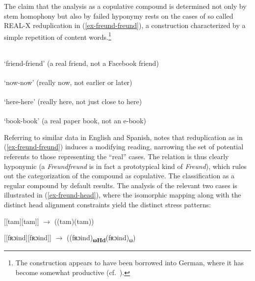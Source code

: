 \documentclass[output=paper
 ,nobabel
 ,draftmode
 ,colorlinks, citecolor=brown
]{langscibook}
\begin{document}
\zl

\noindent
The claim that the analysis as a copulative compound is determined not only by stem homophony but also by failed hyponymy rests on the  cases of so called REAL-X reduplication in (\ref{ex-freund-freund}), a construction characterized by a simple repetition of content words.\footnote{The construction appears to have been borrowed into German, where it has become somewhat productive (cf.\ \citealp{Freywald2015}).}



\eal\label{ex-freund-freund}

\ex {} \\
`friend-friend' (a real friend, not a Facebook friend) \\

\ex {} \\
`now-now' (really now, not earlier or later) \\

\ex {} \\
`here-here' (really here, not just close to here) \\

\ex {} \\
`book-book' (a real paper book, not an e-book) \\


\zl

\largerpage
\noindent
Referring to similar data in English and Spanish, \citet[48]{Horn1993} notes that reduplication as in (\ref{ex-freund-freund}) induces a modifying reading, narrowing the set of potential referents to those representing the ``real'' cases. The relation is thus clearly hyponymic (\eg a \emph{Freundfreund} is in fact a prototypical kind of \emph{Freund}), which rules out the categorization of the compound as copulative. The classification as a regular compound by default results. The analysis of the relevant two cases is illustrated in (\ref{ex-freund-head}), where the isomorphic mapping along with the distinct head alignment constraints yield the distinct stress patterns:

\eal\label{ex-freund-head}

\ex\label{ex-tamtam-comp}
[[tam][tam]]\textbf{} $\rightarrow$ ((tam)(tam))\textbf{} 

\ex\label{ex-freundfreund-comp}
[[fʀɔind][fʀɔind]]\textbf{} $\rightarrow$
((fʀɔind)\textbf{\textsubscript{ωHd}}(fʀɔind)\textsubscript{ω})
\zl
\end{document}
